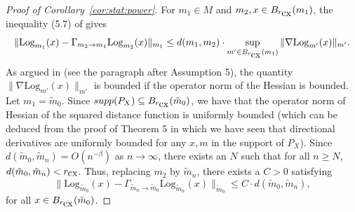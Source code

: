 \documentclass[preprint]{imsart}
\theoremstyle{plain}
\theoremstyle{remark}
\begin{document}
\begin{appendix}
\begin{proof}[Proof of Corollary~\ref{cor:stat:power}]




For $m_1 \in M$ and  $m_2,x \in B_{r_{\mbox{\tiny cx}}}({m}_1)$, the inequality (5.7) of \cite{kendall2011limit} gives 
$$
\| \mbox{Log}_{m_1}(x) - \Gamma_{m_2 \to m_1} \mbox{Log}_{m_2}(x) \|_{m_1} \le  
d(m_1,m_2) \cdot \sup_{m' \in B_{r_{\mbox{\tiny cx}}}(m_1) } \| \nabla \mbox{Log}_{m'}(x)\|_{m'}.
$$
As argued in \cite{Lin2022additive} (see the paragraph after Assumption 5), the quantity $\| \nabla \mbox{Log}_{m'}(x) \|_{m'}$ is bounded if the operator norm of the Hessian is bounded.  
Let $m_1 = \tilde{m}_0$. Since $\textsf{supp}(P_X) \subseteq B_{r_{\mbox{\tiny cx}}} (\tilde{m}_0)$, we have that the operator norm of Hessian of the squared distance function is uniformly bounded (which can be deduced from the proof of Theorem 5 in which we have seen that directional derivatives are uniformly bounded for any $x,m$ in the support of $P_X$). 
Since $d(\tilde{m}_0, \tilde{m}_n) = O(n^{-\beta})$ as $n \to \infty$, there exists an $N$ such that for all $n \ge N$, $d(\tilde{m}_0, \tilde{m}_n) < r_{\mbox{\tiny cx}}$.
Thus, replacing $m_2$ by $\tilde{m}_n$, there exists a $C>0$ satisfying 
\begin{equation}
\label{eq:corollary5_part_xxx}
    \| \mbox{Log}_{\tilde{m}_0}(x) - \Gamma_{\tilde{m}_n \to \tilde{m}_0} \mbox{Log}_{\tilde{m}_n}(x) \|_{\tilde{m}_0} \le  C \cdot
d(\tilde{m}_0,\tilde{m}_n), 
\end{equation}
 for all $x \in B_{r_{\mbox{\tiny cx}}}(\tilde{m}_0)$. 


\end{proof}
\end{appendix}
\end{document}
